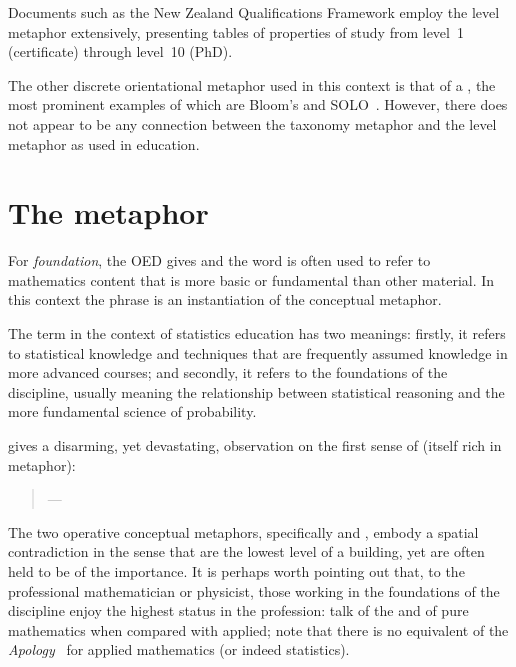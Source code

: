 \noindent
Documents such as the New Zealand Qualifications Framework employ the
level metaphor extensively, presenting tables of properties of study
from level~1 (certificate) through level~10 (PhD).

The other discrete orientational metaphor used in this context is that
of a , the most prominent examples of which are
Bloom's \parencite{anderson2001} and SOLO~\parencite{biggs1982}.
However, there does not appear to be any connection between the
taxonomy metaphor and the level metaphor as used in education.

\section{The  metaphor}

For \emph{foundation}, the OED gives  and the word is
often used to refer to mathematics content that is more basic or
fundamental than other material.  In this context the phrase is an
instantiation of the  conceptual
metaphor.

The term  in the context of statistics education
has two meanings: firstly, it refers to statistical knowledge and
techniques that are frequently assumed knowledge in more advanced
courses; and secondly, it refers to the foundations of the discipline,
usually meaning the relationship between statistical reasoning and the
more fundamental science of probability.

 gives a disarming, yet devastating, observation on
the first sense of  (itself rich in metaphor):

\begin{singlespace}
\begin{quote}
  ---
\end{quote}
\end{singlespace}

\noindent
The two operative conceptual metaphors, specifically  and , embody a spatial
contradiction in the sense that  are the lowest
level of a building, yet are often held to be of the
 importance.  It is perhaps worth pointing out that,
to the professional mathematician or physicist, those working in the
foundations of the discipline enjoy the highest status in the
profession:  talk of the
 and  of pure mathematics
when compared with applied; note that there is no equivalent of the
\emph{Apology}~\parencite{hardy1940} for applied mathematics (or
indeed statistics).

